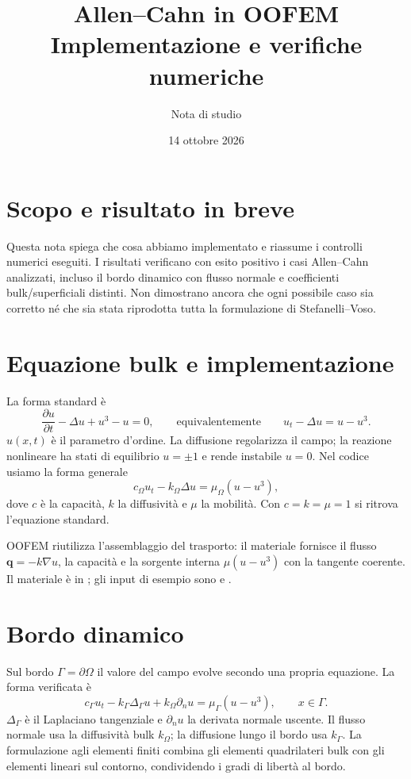 \documentclass[11pt,a4paper]{article}
\title{Allen--Cahn in OOFEM\\[0.25em]\large Implementazione e verifiche numeriche}
\author{Nota di studio}
\date{14 ottobre 2026}
\begin{document}
\maketitle

\section*{Scopo e risultato in breve}
Questa nota spiega che cosa abbiamo implementato e riassume i controlli numerici eseguiti. I risultati verificano con esito positivo i casi Allen--Cahn analizzati, incluso il bordo dinamico con flusso normale e coefficienti bulk/superficiali distinti. Non dimostrano ancora che ogni possibile caso sia corretto né che sia stata riprodotta tutta la formulazione di Stefanelli--Voso.

\section{Equazione bulk e implementazione}
La forma standard è
\[
  \frac{\partial u}{\partial t}-\Delta u+u^3-u=0,
  \qquad\text{equivalentemente}\qquad
  u_t-\Delta u=u-u^3.
\]
$u(x,t)$ è il parametro d'ordine. La diffusione regolarizza il campo; la reazione nonlineare ha stati di equilibrio $u=\pm1$ e rende instabile $u=0$. Nel codice usiamo la forma generale
\[
 c_\Omega u_t-k_\Omega\Delta u=\mu_\Omega(u-u^3),
\]
dove $c$ è la capacità, $k$ la diffusività e $\mu$ la mobilità. Con $c=k=\mu=1$ si ritrova l'equazione standard.

OOFEM riutilizza l'assemblaggio del trasporto: il materiale fornisce il flusso $\boldsymbol q=-k\nabla u$, la capacità e la sorgente interna $\mu(u-u^3)$ con la tangente coerente. Il materiale è in ; gli input di esempio sono  e .

\section{Bordo dinamico}
Sul bordo $\Gamma=\partial\Omega$ il valore del campo evolve secondo una propria equazione. La forma verificata è
\[
 c_\Gamma u_t-k_\Gamma\Delta_\Gamma u
       +k_\Omega\partial_n u=\mu_\Gamma(u-u^3),
       \qquad x\in\Gamma.
\]
$\Delta_\Gamma$ è il Laplaciano tangenziale e $\partial_n u$ la derivata normale uscente. Il flusso normale usa la diffusività bulk $k_\Omega$; la diffusione lungo il bordo usa $k_\Gamma$. La formulazione agli elementi finiti combina gli elementi quadrilateri bulk con gli elementi lineari sul contorno, condividendo i gradi di libertà al bordo.
\end{document}

